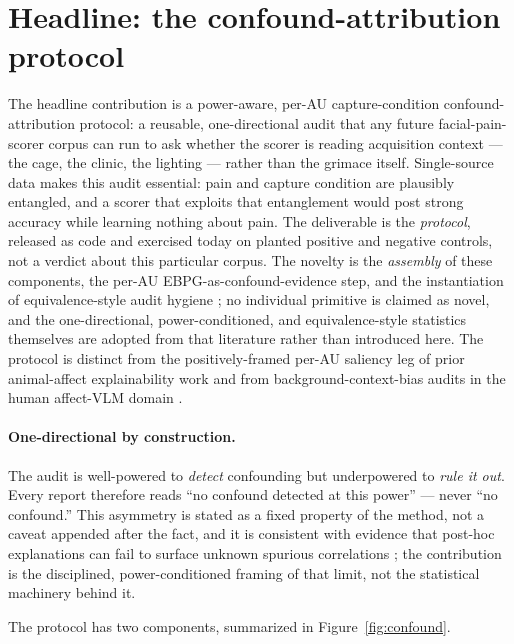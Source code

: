 \section{Headline: the confound-attribution protocol}
\label{sec:confound-protocol}

The headline contribution is a power-aware, per-AU capture-condition
confound-attribution protocol: a reusable, one-directional audit that any future
facial-pain-scorer corpus can run to ask whether the scorer is reading
acquisition context --- the cage, the clinic, the lighting --- rather than the
grimace itself. Single-source data makes this audit essential: pain and capture
condition are plausibly entangled, and a scorer that exploits that entanglement
would post strong accuracy while learning nothing about pain. The deliverable is
the \emph{protocol}, released as code and exercised today on planted positive
and negative controls, not a verdict about this particular corpus. The novelty
is the \emph{assembly} of these components, the per-AU
EBPG-as-confound-evidence step, and the instantiation of equivalence-style audit
hygiene
\cite{huanghooker2026fairness,singh2023samplesize}; no individual primitive is
claimed as novel, and the one-directional, power-conditioned, and
equivalence-style statistics themselves are adopted from that literature rather
than introduced here. The protocol is distinct from the positively-framed
per-AU saliency leg of prior animal-affect explainability work
\cite{lencioni2025segment} and from background-context-bias audits in the human
affect-VLM domain \cite{context2025becki}.

\paragraph{One-directional by construction.} The audit is well-powered to
\emph{detect} confounding but underpowered to \emph{rule it out}. Every report
therefore reads ``no confound detected at this power'' --- never ``no
confound.'' This asymmetry is stated as a fixed property of the method, not a
caveat appended after the fact, and it is consistent with evidence that post-hoc
explanations can fail to surface unknown spurious correlations
\cite{adebayo2022posthoc}; the contribution is the disciplined,
power-conditioned framing of that limit, not the statistical machinery behind
it.

The protocol has two components, summarized in Figure~\ref{fig:confound}.

